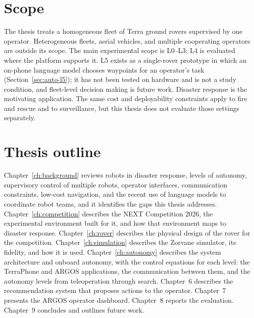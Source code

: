 \section*{Scope}

The thesis treats a homogeneous fleet of Terra ground rovers supervised by one operator.
Heterogeneous fleets, aerial vehicles, and multiple cooperating operators are outside its scope.
The main experimental scope is L0--L3; L4 is evaluated where the platform supports it.
L5 exists as a single-rover prototype in which an on-phone language model chooses waypoints for an operator's task (Section~\ref{sec:auto-l5}); it has not been tested on hardware and is not a study condition, and fleet-level decision making is future work.
Disaster response is the motivating application.
The same cost and deployability constraints apply to fire and rescue and to surveillance, but this thesis does not evaluate those settings separately.

\section*{Thesis outline}

Chapter~\ref{ch:background} reviews robots in disaster response, levels of autonomy, supervisory control of multiple robots, operator interfaces, communication constraints, low-cost navigation, and the recent use of language models to coordinate robot teams, and it identifies the gaps this thesis addresses.
Chapter~\ref{ch:competition} describes the NEXT Competition 2026, the experimental environment built for it, and how that environment maps to disaster response.
Chapter~\ref{ch:rover} describes the physical design of the rover for the competition.
Chapter~\ref{ch:simulation} describes the Zorvane simulator, its fidelity, and how it is used.
Chapter~\ref{ch:autonomy} describes the system architecture and onboard autonomy, with the control equations for each level: the TerraPhone and ARGOS applications, the communication between them, and the autonomy levels from teleoperation through search.
Chapter~6 describes the recommendation system that proposes actions to the operator.
Chapter~7 presents the ARGOS operator dashboard.
Chapter~8 reports the evaluation.
Chapter~9 concludes and outlines future work.
